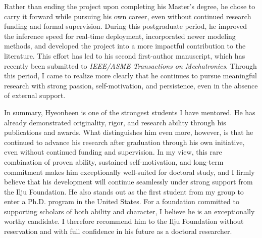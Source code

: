 Rather than ending the project upon completing his Master's degree, he chose to carry it forward while pursuing his own career, even without continued research funding and formal supervision. During this postgraduate period, he improved the inference speed for real-time deployment, incorporated newer modeling methods, and developed the project into a more impactful contribution to the literature. This effort has led to his second first-author manuscript, which has recently been submitted to \textit{IEEE/ASME Transactions on Mechatronics}. Through this period, I came to realize more clearly that he continues to pursue meaningful research with strong passion, self-motivation, and persistence, even in the absence of external support.

In summary, Hyeonbeen is one of the strongest students I have mentored. He has already demonstrated originality, rigor, and research ability through his publications and awards. What distinguishes him even more, however, is that he continued to advance his research after graduation through his own initiative, even without continued funding and supervision. In my view, this rare combination of proven ability, sustained self-motivation, and long-term commitment makes him exceptionally well-suited for doctoral study, and I firmly believe that his development will continue seamlessly under strong support from the Ilju Foundation. He also stands out as the first student from my group to enter a Ph.D. program in the United States. For a foundation committed to supporting scholars of both ability and character, I believe he is an exceptionally worthy candidate. I therefore recommend him to the Ilju Foundation without reservation and with full confidence in his future as a doctoral researcher.